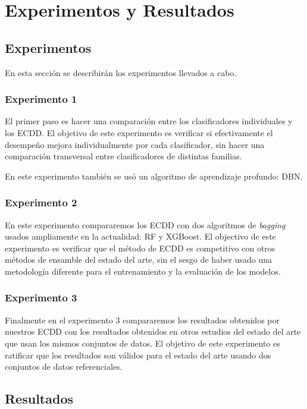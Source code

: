 \chapter{Experimentos y Resultados}


\section{Experimentos}

En esta sección se describirán los experimentos llevados a cabo.

\subsection{Experimento 1}

El primer paso es hacer una comparación entre los clasificadores individuales y los \ac{ECDD}. El objetivo de este experimento es verificar si efectivamente el desempeño mejora individualmente por cada clasificador, sin hacer una comparación transversal entre clasificadores de distintas familias.

En este experimento también se usó un algoritmo de aprendizaje profundo: \ac{DBN}.

\subsection{Experimento 2}

En este experimento compararemos los \ac{ECDD} con dos algoritmos de \textit{bagging} usados ampliamente en la actualidad: \ac{RF} y \ac{XGBoost}. El objectivo de este experimento es verificar que el método de \ac{ECDD} es competitivo con otros métodos de ensamble del estado del arte, sin el sesgo de haber usado una metodología diferente para el entrenamiento y la evaluación de los modelos.

\subsection{Experimento 3}

Finalmente en el experimento 3 compararemos los resultados obtenidos por nuestros \ac{ECDD} con los resultados obtenidos en otros estudios del estado del arte que usan los mismos conjuntos de datos. El objetivo de este experimento es ratificar que los resultados son válidos para el estado del arte usando dos conjuntos de datos referenciales.


\section{Resultados}

